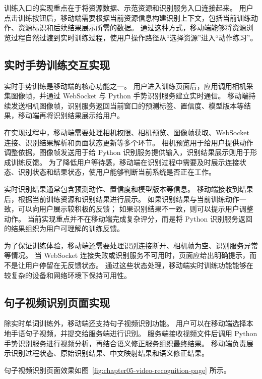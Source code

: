 训练入口的实现重点在于将资源数据、示范资源和识别服务入口连接起来。
用户点击训练按钮后，移动端需要根据当前资源信息构建识别上下文，包括当前训练动作、资源标识和后续结果展示所需的数据。
通过这种方式，移动端能够将资源浏览过程自然过渡到实时训练过程，使用户操作路径从“选择资源”进入“动作练习”。

\subsection{实时手势训练交互实现}

实时手势训练是移动端的核心功能之一。
用户进入训练页面后，应用调用相机采集图像帧，并通过 WebSocket 与 Python 手势识别服务建立实时通信。
移动端持续发送相机图像帧，识别服务返回当前窗口的预测标签、置信度、模型版本等结果，移动端再将识别结果展示给用户。

在实现过程中，移动端需要处理相机权限、相机预览、图像帧获取、WebSocket 连接、识别结果解析和页面状态更新等多个环节。
相机预览用于给用户提供动作调整依据，图像帧发送用于给 Python 识别服务提供输入，识别结果展示则用于形成训练反馈。
为了降低用户等待感，移动端在识别过程中需要及时展示连接状态、识别状态和结果状态，使用户能够判断当前系统是否正在工作。

实时识别结果通常包含预测动作、置信度和模型版本等信息。
移动端接收到结果后，根据当前训练资源和识别结果进行展示。
如果识别结果与当前训练动作一致，可以向用户展示较积极的反馈；
如果识别结果不一致，则可以提示用户调整动作。
当前实现重点并不在移动端完成复杂评分，而是将 Python 识别服务返回的结果组织为用户可理解的训练反馈。

为了保证训练体验，移动端还需要处理识别连接断开、相机帧为空、识别服务异常等情况。
当 WebSocket 连接失败或识别服务不可用时，页面应给出明确提示，而不是让用户停留在无反馈状态。
通过这些状态处理，移动端实时训练功能能够在较复杂的设备和网络环境下保持可用性。

\subsection{句子视频识别页面实现}

除实时单词训练外，移动端还支持句子视频识别功能。
用户可以在移动端选择本地手语句子视频，并提交给服务端进行识别。
服务端接收视频文件后调用 Python 手势识别服务进行视频分析，再结合语义修正服务组织最终结果。
移动端负责展示识别过程状态、原始识别结果、中文映射结果和语义修正结果。

句子视频识别页面效果如图~\ref{fig:chapter05-video-recognition-page} 所示。


